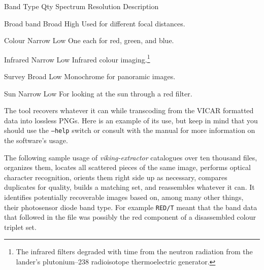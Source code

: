 {
    \bTABLE[split=repeat,option=stretch]
    \setupTABLE[column][5]
        [width=.43\textwidth,
        align=yes]
    \setupTABLE[row][each][align=center]
    \setupTABLE[4][1][align=center]

\bTABLEhead
    \bTR[bottomframe=on]
      \bTH  Band Type \eTH
      \bTH  Qty \eTH
      \bTH  Spectrum \eTH
      \bTH  Resolution \eTH
      \bTH  Description \eTH
    \eTR
\eTABLEhead

\bTABLEbody
    \bTR
      \bTC Broad band \eTC
       \eTC
      \bTC Broad \eTC
      \bTC High \eTC
      \bTC Used for different focal distances. \eTC
    \eTR

    \bTR
      \bTC Colour \eTC
       \eTC
      \bTC Narrow \eTC
      \bTC Low \eTC
      \bTC One each for red, green, and blue. \eTC
    \eTR

    \bTR
      \bTC Infrared \eTC
       \eTC
      \bTC Narrow \eTC
      \bTC Low \eTC
      \bTC Infrared colour imaging.\footnote{The infrared filters degraded with time from the neutron radiation from the lander's plutonium--238 radioisotope thermoelectric generator.} \eTC
    \eTR

    \bTR
      \bTC Survey \eTC
       \eTC
      \bTC Broad \eTC
      \bTC Low \eTC
      \bTC Monochrome for panoramic images. \eTC
    \eTR
    
    \bTR
      \bTC Sun \eTC
       \eTC
      \bTC Narrow \eTC
      \bTC Low \eTC
      \bTC For looking at the sun through a red filter. \eTC
    \eTR

\eTABLEbody

\eTABLE
}

The tool recovers whatever it can while transcoding from the VICAR formatted data into lossless PNGs. Here is an example of its use, but keep in mind that you should use the {\tt --help} switch or consult with the manual for more information on the software's usage.

The following sample usage of {\it viking-extractor} catalogues over ten thousand files, organizes them, locates all scattered pieces of the same image, performs optical character recognition, orients them right side up as necessary, compares duplicates for quality, builds a matching set, and reassembles whatever it can. It identifies potentially recoverable images based on, among many other things, their photosensor diode band type. For example {\tt RED/T} meant that the band data that followed in the file was possibly the red component of a disassembled colour triplet set.

